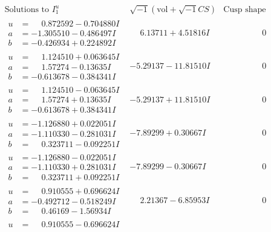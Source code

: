 \documentclass[1p]{elsarticle_modified}
\theoremstyle{definition}
\newcommand{\I}{\sqrt{-1}}
\begin{document}
$$\begin{array}{c|c|c}
\text{Solutions to }I^u_{1}& \I (\text{vol} + \sqrt{-1}CS) & \text{Cusp shape}\\
 \hline 
\begin{aligned}
u &= \phantom{-}0.872592 - 0.704880 I \\
a &= -1.305510 - 0.486497 I \\
b &= -0.426934 + 0.224892 I\end{aligned}
 & \phantom{-}6.13711 + 4.51816 I & \phantom{-0.000000 } 0 \\ \hline\begin{aligned}
u &= \phantom{-}1.124510 + 0.063645 I \\
a &= \phantom{-}1.57274 - 0.13635 I \\
b &= -0.613678 - 0.384341 I\end{aligned}
 & -5.29137 - 11.81510 I & \phantom{-0.000000 } 0 \\ \hline\begin{aligned}
u &= \phantom{-}1.124510 - 0.063645 I \\
a &= \phantom{-}1.57274 + 0.13635 I \\
b &= -0.613678 + 0.384341 I\end{aligned}
 & -5.29137 + 11.81510 I & \phantom{-0.000000 } 0 \\ \hline\begin{aligned}
u &= -1.126880 + 0.022051 I \\
a &= -1.110330 - 0.281031 I \\
b &= \phantom{-}0.323711 - 0.092251 I\end{aligned}
 & -7.89299 + 0.30667 I & \phantom{-0.000000 } 0 \\ \hline\begin{aligned}
u &= -1.126880 - 0.022051 I \\
a &= -1.110330 + 0.281031 I \\
b &= \phantom{-}0.323711 + 0.092251 I\end{aligned}
 & -7.89299 - 0.30667 I & \phantom{-0.000000 } 0 \\ \hline\begin{aligned}
u &= \phantom{-}0.910555 + 0.696624 I \\
a &= -0.492712 - 0.518249 I \\
b &= \phantom{-}0.46169 - 1.56934 I\end{aligned}
 & \phantom{-}2.21367 - 6.85953 I & \phantom{-0.000000 } 0 \\ \hline\begin{aligned}
u &= \phantom{-}0.910555 - 0.696624 I \\

\end{aligned}
\end{array}$$
\end{document}
